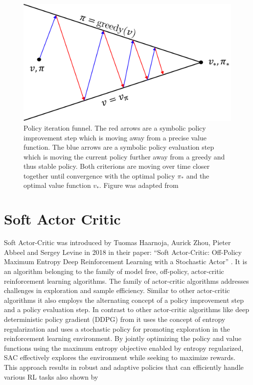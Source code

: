 % 
\begin{figure}
    \begin{center}
        \includegraphics[width=0.5\linewidth]{figures/background/PolicyIterationFunnel.png}
        \caption[Policy iteration funnel]{Policy iteration funnel. The red arrows are a symbolic policy improvement step which is moving away from a precise value function. The blue arrows are a symbolic policy evaluation step which is moving the current policy further away from a greedy and thus stable policy. Both criterions are moving over time closer together until convergence with the optimal policy $\pi_*$ and the optimal value function $v_*$. Figure was adapted from \cite{SuttonBartoRLBook}}
        \label{fig:policy-iteration-concept-funnel}
    \end{center}
\end{figure}

\section{Soft Actor Critic}\label{sec:SAC}

Soft Actor-Critic was introduced by Tuomas Haarnoja, Aurick Zhou, Pieter Abbeel and
Sergey Levine in 2018 in their paper: ``Soft Actor-Critic: Off-Policy Maximum Entropy Deep Reinforcement Learning
with a Stochastic Actor'' \cite{SAC_Paper}. It is an algorithm belonging to the family of model free, off-policy, actor-critic reinforcement learning algorithms. The family of actor-critic algorithms addresses challenges in exploration and sample efficiency. Similar to  other actor-critic algorithms it also employs the alternating concept of a policy improvement step and a policy evaluation step. In contrast to other actor-critic algorithms like deep deterministic policy gradient (DDPG) from \cite{DPG_Paper} \cite{DDPG_Paper} it uses the concept of entropy regularization and uses a stochastic policy for promoting exploration in the reinforcement learning environment. 
By jointly optimizing the policy and value functions using the maximum entropy objective enabled by entropy regularized, SAC effectively explores the environment while seeking to maximize rewards. This approach results in robust and adaptive policies that can efficiently handle various RL tasks also shown by \cite{SAC_Applications_Paper}

